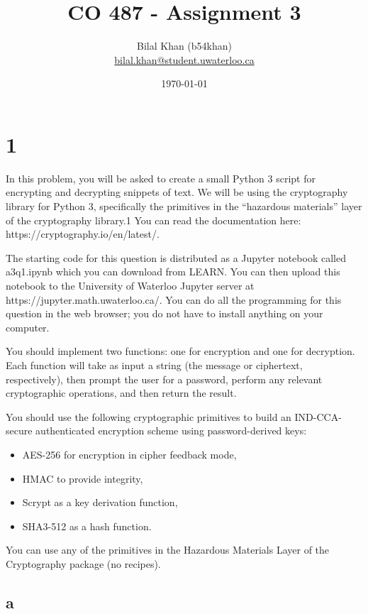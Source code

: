 \documentclass[11pt]{article}
\title{CO 487 - Assignment 3}
\author{Bilal Khan (b54khan)\\
\href{mailto:bilal.khan@student.uwaterloo.ca}{bilal.khan@student.uwaterloo.ca}}
\date{\today}
\begin{document}
\maketitle

\tableofcontents

\section{1}

In this problem, you will be asked to create a small Python 3 script for encrypting and decrypting snippets of text. We will be using the cryptography library for Python 3, specifically the primitives in the “hazardous materials” layer of the cryptography library.1 You can read the documentation here: https://cryptography.io/en/latest/.

The starting code for this question is distributed as a Jupyter notebook called a3q1.ipynb which you can download from LEARN. You can then upload this notebook to the University of Waterloo Jupyter server at https://jupyter.math.uwaterloo.ca/. You can do all the programming for this question in the web browser; you do not have to install anything on your computer.

You should implement two functions: one for encryption and one for decryption. Each function will take as input a string (the message or ciphertext, respectively), then prompt the user for a password, perform any relevant cryptographic operations, and then return the result.

You should use the following cryptographic primitives to build an IND-CCA-secure authenticated encryption scheme using password-derived keys:

\begin{itemize}
    \item AES-256 for encryption in cipher feedback mode,
    \item HMAC to provide integrity,
    \item Scrypt as a key derivation function,
    \item SHA3-512 as a hash function.
\end{itemize}

You can use any of the primitives in the Hazardous Materials Layer of the Cryptography package (no recipes).

\subsection{a}
\end{document}
